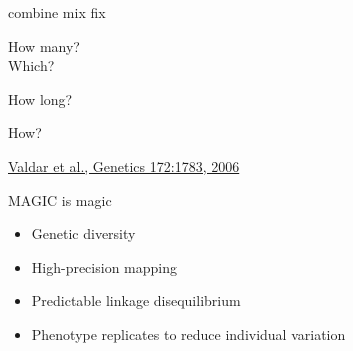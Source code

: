 \documentclass[12pt]{article}
\newcommand{\citesize}{\fontsize{14}{18} \selectfont}
\newcommand{\headsize}{\fontsize{35}{35} \selectfont}
\newcommand{\smallsize}{\fontsize{25}{30} \selectfont}
\newcommand{\smallersize}{\fontsize{20}{25} \selectfont}
\begin{document}
{\smallsize \color{myyellow}
\hspace*{52mm} combine \hspace*{35mm} mix \hspace*{52mm} fix

\smallersize
\color{mywhite}
\vspace{20pt}

\hspace*{6mm}
\begin{minipage}[t]{45mm}
\vspace*{0mm}
\centering

How many? \\[20pt]
Which?
\end{minipage}
\hspace{57mm}
\begin{minipage}[t]{45mm}
\vspace*{0mm}
\centering

How long?
\end{minipage}
\hspace{18mm}
\begin{minipage}[t]{45mm}
\vspace*{0mm}
\centering

How?
\end{minipage}


\vfill

\hfill {\citesize \color{citecolor} \href{http://www.genetics.org/content/172/3/1783.full}{Valdar et al., Genetics 172:1783, 2006}}

\vspace*{5mm}


\newpage

\headsize \color{myyellow}
\hfill \begin{minipage}{5.75in}
\centering
MAGIC is magic
\end{minipage}

\vspace{25mm}

\color{mywhite}
\smallsize

\hfill \begin{minipage}{10in}
\begin{itemize}
\itemsep24pt
\item Genetic diversity

\item High-precision mapping

\item Predictable linkage disequilibrium

\item Phenotype replicates to reduce individual variation


\end{itemize}
\end{minipage}}
\end{document}
